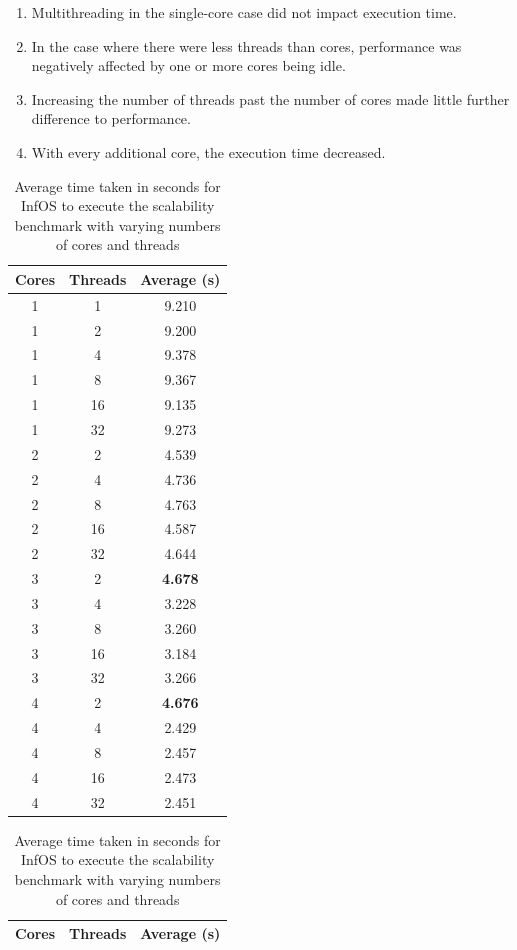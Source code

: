 \documentclass[bsc,frontabs,singlespacing,parskip,deptreport]{infthesis}     %
\begin{document}
\begin{enumerate}
    \item Multithreading in the single-core case did not impact execution time.
    \item In the case where there were less threads than cores, performance was negatively affected by one or more cores being idle.
    \item Increasing the number of threads past the number of cores made little further difference to performance.
    \item With every additional core, the execution time decreased.
\end{enumerate}

\begin{table}[h]
\parbox{.45\linewidth}{
\centering
\small
\begin{tabular}{ccc}
\toprule
Cores &Threads &Average (s) \\
\midrule
1 &1 &9.210 \\
\midrule
1 &2 &9.200 \\
1 &4 &9.378 \\
1 &8 &9.367 \\
1 &16 &9.135 \\
1 &32 &9.273 \\
\midrule
2 &2 &4.539 \\
2 &4 &4.736 \\
2 &8 &4.763 \\
2 &16 &4.587 \\
2 &32 &4.644 \\
\midrule
3 &2 &\textbf{4.678} \\
3 &4 &3.228 \\
3 &8 &3.260 \\
3 &16 &3.184 \\
3 &32 &3.266 \\
\midrule
4 &2 &\textbf{4.676} \\
4 &4 &2.429 \\
4 &8 &2.457 \\
4 &16 &2.473 \\
4 &32 &2.451 \\
\bottomrule
\end{tabular}
\caption{Average time taken in seconds for InfOS to execute the scalability benchmark with varying numbers of cores and threads}\label{timing-scalability-infos}
}
\hfill
\parbox{.45\linewidth}{
\centering
\small
\begin{tabular}{ccc}
\toprule
Cores &Threads &Average (s) \\
\midrule

\end{tabular}}
\end{table}
\end{document}

